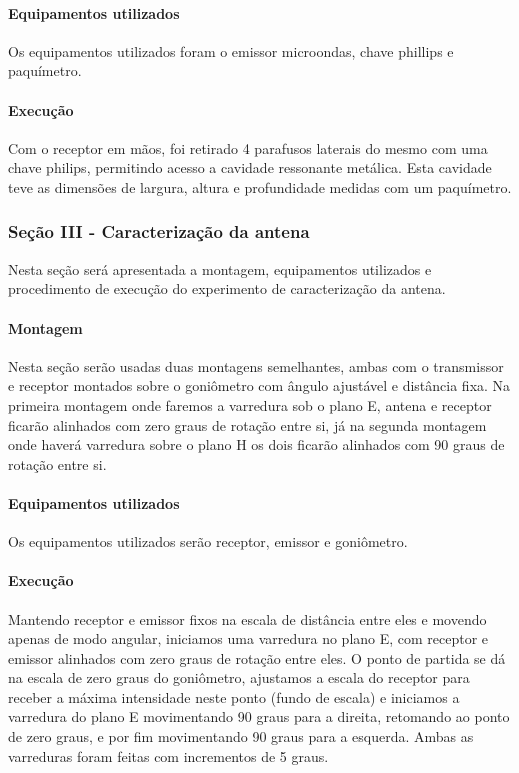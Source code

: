 \documentclass[12pt]{article}
\begin{document}
\paragraph{Equipamentos utilizados}
Os equipamentos utilizados foram o emissor microondas, chave phillips
e paquímetro.

\paragraph{Execução}
Com o receptor em mãos, foi retirado 4 parafusos laterais do mesmo
com uma chave philips, permitindo acesso a cavidade ressonante
metálica. Esta cavidade teve as dimensões de largura, altura e
profundidade medidas com um paquímetro.

\subsubsection{Seção III - Caracterização da antena}
Nesta seção será apresentada a montagem, equipamentos utilizados e
procedimento de execução do experimento de caracterização da antena.

\paragraph{Montagem}
Nesta seção serão usadas duas montagens semelhantes, ambas com o
transmissor e receptor montados sobre o goniômetro com ângulo
ajustável e distância fixa. Na primeira montagem onde faremos a
varredura sob o plano E, antena e receptor ficarão alinhados com zero
graus de rotação entre si, já na segunda montagem onde haverá
varredura sobre o plano H os dois ficarão alinhados com 90 graus de
rotação entre si.

\paragraph{Equipamentos utilizados}
Os equipamentos utilizados serão receptor, emissor e goniômetro.

\paragraph{Execução}
Mantendo receptor e emissor fixos na escala de distância entre eles e
movendo apenas de modo angular, iniciamos uma varredura no plano E,
com receptor e emissor alinhados com zero graus de rotação entre
eles. O ponto de partida se dá na escala de zero graus do goniômetro,
ajustamos a escala do receptor para receber a máxima intensidade
neste ponto (fundo de escala) e iniciamos a varredura do plano E
movimentando 90 graus para a direita, retomando ao ponto de zero
graus, e por fim movimentando 90 graus para a esquerda. Ambas as
varreduras foram feitas com incrementos de 5 graus.
\end{document}
